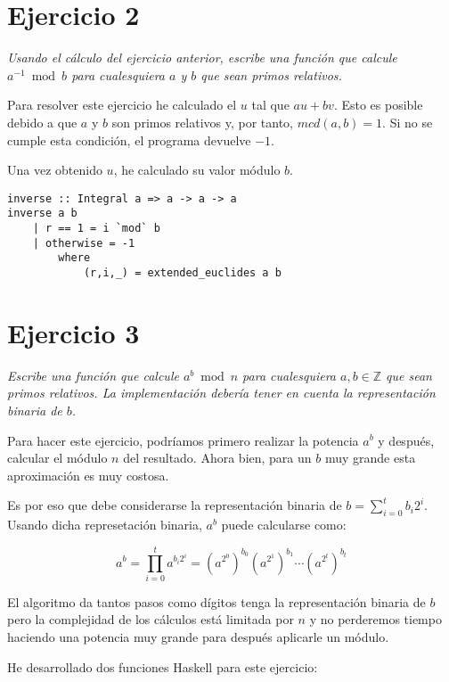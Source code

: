 \documentclass[10pt,spanish]{article}
\begin{document}
\section{\textcolor{rojo}Ejercicio 2}
\textit{Usando el cálculo del ejercicio anterior, escribe una función que calcule $a^{-1}\bmod b$ para cualesquiera $a$ y $b$ que sean primos relativos.}

Para resolver este ejercicio he calculado el $u$ tal que $au + bv$. Esto es posible debido a que $a$ y $b$ son primos relativos y, por tanto, $mcd(a,b) = 1$. Si no se cumple esta condición, el programa devuelve $-1$.

Una vez obtenido $u$, he calculado su valor módulo $b$.

\begin{verbatim}
inverse :: Integral a => a -> a -> a
inverse a b
    | r == 1 = i `mod` b
    | otherwise = -1
        where
            (r,i,_) = extended_euclides a b
\end{verbatim}

\section{\textcolor{rojo}Ejercicio 3}
\textit{Escribe una función que calcule $a^b \bmod n$ para cualesquiera $a, b \in \mathbb{Z}$ que sean primos relativos. La implementación debería tener en cuenta la representación binaria de $b$.}

Para hacer este ejercicio, podríamos primero realizar la potencia $a^b$ y después, calcular el módulo $n$ del resultado. Ahora bien, para un $b$ muy grande esta aproximación es muy costosa.

Es por eso que debe considerarse la representación binaria de $b = \sum_{i=0}^t b_i 2^i$. Usando dicha represetación binaria, $a^b$ puede calcularse como:

\begin{displaymath}
a^b = \prod_{i=0}^{t} a^{b_i2^i} = \left(a^{2^0} \right)^{b_0} \left(a^{2^1} \right)^{b_1} \cdots \left(a^{2^t} \right)^{b_t}
\end{displaymath}

El algoritmo da tantos pasos como dígitos tenga la representación binaria de $b$ pero la complejidad de los cálculos está limitada por $n$ y no perderemos tiempo haciendo una potencia muy grande para después aplicarle un módulo.

He desarrollado dos funciones Haskell para este ejercicio:
\end{document}
